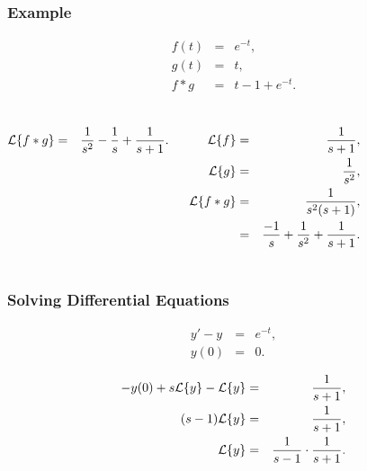 \begin{frame}
  \frametitle{Example}

  \vspace*{-3em}
  \begin{eqnarray*}
    f(t) & = & e^{-t}, \\
    g(t) & = & t, \\
    f*g & = & t - 1 + e^{-t}.
  \end{eqnarray*}

  \begin{columns}
  
    {%

      \begin{eqnarray*}
        \laplace{f*g} & = & \frac{1}{s^2} - \frac{1}{s} + \frac{1}{s+1}.
      \end{eqnarray*}

    }

    {%

      \begin{eqnarray*}
        \laplace{f} & = & \frac{1}{s+1}, \\
        \laplace{g} & = & \frac{1}{s^2}, \\
        \laplace{f*g} & = & \frac{1}{s^2(s+1)}, \\
        & = & \frac{-1}{s} + \frac{1}{s^2} + \frac{1}{s+1}.
      \end{eqnarray*}

    }

  \end{columns}

  \vfill
  
\end{frame}


\begin{frame}
  \frametitle{Solving Differential Equations}

  \begin{eqnarray*}
    y'-y & = & e^{-t}, \\
    y(0) & = & 0.
  \end{eqnarray*}

  {
    \begin{eqnarray*}
      -y(0) + s \laplace{y} - \laplace{y} & = & \frac{1}{s+1}, \\
      (s-1) \laplace{y} & = & \frac{1}{s+1}, \\
      \laplace{y} & = & \frac{1}{s-1}\cdot\frac{1}{s+1}.
    \end{eqnarray*}
  }


\end{frame}


